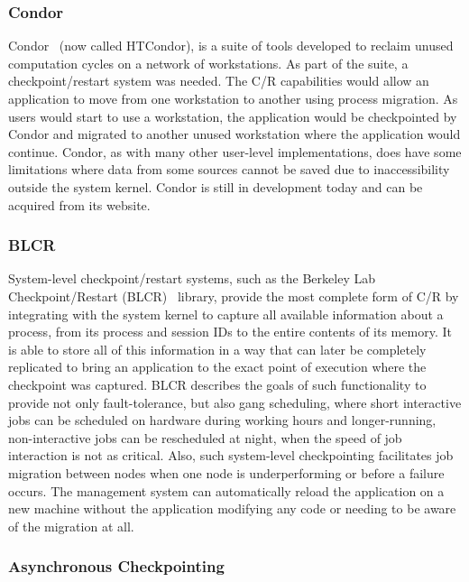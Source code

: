 \subsubsection{Condor}

Condor~\cite{Litzkow:1992ve, Litzkow:1997wda} (now called HTCondor), is a suite 
of tools developed to reclaim unused computation cycles on a network of 
workstations. As part of the suite, a checkpoint/restart system was needed. The 
C/R capabilities would allow an application to move from one workstation to another 
using process migration. As users would start to use a workstation, the 
application would be checkpointed by Condor and migrated to another unused 
workstation where the application would continue. Condor, as with many other user-level 
implementations, does have some limitations where data from some sources cannot be 
saved due to inaccessibility outside the system kernel. Condor is still in development today and can be acquired from its website.

\subsubsection{BLCR}

System-level checkpoint/restart systems, such as the Berkeley Lab 
Checkpoint/Restart (BLCR)~\cite{Duell:tr} library, provide the most complete 
form of C/R by integrating with the system kernel to capture all available 
information about a process, from its process and session IDs to the entire 
contents of its memory. It is able to store all of this information in a way 
that can later be completely replicated to bring an application to the exact 
point of execution where the checkpoint was captured. BLCR describes the goals 
of such functionality to provide not only fault-tolerance, but also gang 
scheduling, where short interactive jobs can be scheduled on hardware during 
working hours and longer-running, non-interactive jobs can be rescheduled at 
night, when the speed of job interaction is not as critical. Also, such system-level 
checkpointing facilitates job migration between nodes when one node is 
underperforming or before a failure occurs. The management system can 
automatically reload the application on a new machine without the application 
modifying any code or needing to be aware of the migration at all.

\subsubsection{Asynchronous Checkpointing}

